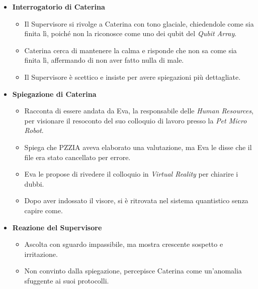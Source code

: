 \begin{itemize}
    \item \textbf{Interrogatorio di Caterina}
    \begin{itemize}
        \item Il Supervisore si rivolge a Caterina con tono glaciale, chiedendole come sia finita lì, poiché non la riconosce come uno dei qubit del \emph{Qubit Array}.
        \item Caterina cerca di mantenere la calma e risponde che non sa come sia finita lì, affermando di non aver fatto nulla di male.
        \item Il Supervisore è scettico e insiste per avere spiegazioni più dettagliate.
    \end{itemize}
    \item \textbf{Spiegazione di Caterina}
    \begin{itemize}
        \item Racconta di essere andata da Eva, la responsabile delle \emph{Human Resources}, per visionare il resoconto del suo colloquio di lavoro presso la \emph{Pet Micro Robot}.
        \item Spiega che PZZIA aveva elaborato una valutazione, ma Eva le disse che il file era stato cancellato per errore.
        \item Eva le propose di rivedere il colloquio in \emph{Virtual Reality} per chiarire i dubbi.
        \item Dopo aver indossato il visore, si è ritrovata nel sistema quantistico senza capire come.
    \end{itemize}
    \item \textbf{Reazione del Supervisore}
    \begin{itemize}
        \item Ascolta con sguardo impassibile, ma mostra crescente sospetto e irritazione.
        \item Non convinto dalla spiegazione, percepisce Caterina come un'anomalia sfuggente ai suoi protocolli.
    \end{itemize}
\end{itemize}



